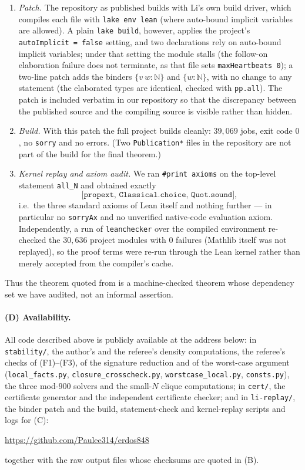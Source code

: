 \documentclass[11pt,a4paper]{article}
\theoremstyle{plain}
\theoremstyle{definition}
\theoremstyle{remark}
\begin{document}
\begin{enumerate}
\item \emph{Patch.} The repository as published builds with Li's own build driver, which compiles
each file with \texttt{lake env lean} (where auto-bound implicit variables are allowed). A plain
\texttt{lake build}, however, applies the project's \texttt{autoImplicit = false} setting, and two
declarations rely on auto-bound implicit variables; under that setting the module stalls (the follow-on elaboration failure
does not terminate, as that file sets \texttt{maxHeartbeats 0}); a two-line patch adds the binders
$\{v\ w : \mathbb{N}\}$ and $\{w : \mathbb{N}\}$, with no change to any statement (the elaborated
types are identical, checked with \texttt{pp.all}). The patch is included verbatim in our repository so that the discrepancy between the
published source and the compiling source is visible rather than hidden.
\item \emph{Build.} With this patch the full project builds cleanly: $39{,}069$ jobs, exit code $0$,
no \texttt{sorry} and no errors. (Two \texttt{Publication*} files in the repository are not part of
the build for the final theorem.)
\item \emph{Kernel replay and axiom audit.} We ran \verb|#print axioms| on the top-level statement
\verb|all_N| and obtained exactly
\[
\texttt{[propext, Classical.choice, Quot.sound]},
\]
i.e.\ the three standard axioms of Lean itself and nothing further --- in
particular no \texttt{sorryAx} and no unverified native-code evaluation axiom. Independently, a run
of \texttt{leanchecker} over the compiled environment re-checked the $30{,}636$ project modules
with $0$ failures (Mathlib itself was not replayed), so the proof terms were re-run through the
Lean kernel rather than merely accepted from the compiler's cache.
\end{enumerate}

Thus the theorem quoted from \cite{Li,LiRepo} is a machine-checked theorem whose dependency set we
have audited, not an informal assertion.

\paragraph{(D) Availability.}
All code described above is publicly available at the address below: in \texttt{stability/}, the
author's and the referee's density computations, the referee's checks of (F1)--(F3), of the
signature reduction and of the worst-case argument (\texttt{local\_facts.py},
\texttt{closure\_crosscheck.py}, \texttt{worstcase\_local.py}, \texttt{consts.py}), the three
mod-$900$ solvers and the small-$N$ clique computations; in \texttt{cert/}, the certificate generator
and the independent certificate checker; and in \texttt{li-replay/}, the binder patch and the build,
statement-check and kernel-replay scripts and logs for (C):
\begin{center}
\url{https://github.com/Paulee314/erdos848}
\end{center}
together with the raw output files whose checksums are quoted in (B).
\end{document}
